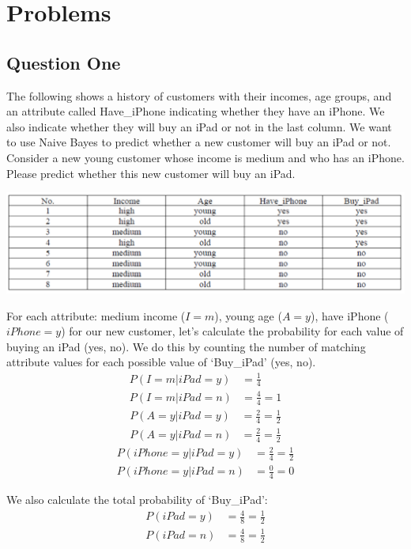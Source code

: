 \section{Problems}

\subsection{Question One}

The following shows a history of customers with their incomes, age groups, and an attribute called Have\_iPhone indicating whether they have an iPhone. We also indicate whether they will buy an iPad or not in the last column. We want to use Naive Bayes to predict whether a new customer will buy an iPad or not. Consider a new young customer whose income is medium and who has an iPhone. Please predict whether this new customer will buy an iPad.

\includegraphics[width=1\textwidth]{media/hw5_q1.png}

For each attribute: medium income ($I=m$), young age ($A=y$), have iPhone ($iPhone=y$) for our new customer, let's calculate the probability for each value of buying an iPad (yes, no). We do this by counting the number of matching attribute values for each possible value of `Buy\_iPad' (yes, no).
\begin{align}
    P(I=m | iPad = y) &= \frac{1}{4} \label{eq:q1_1} \nonumber \\
    P(I=m | iPad = n) &= \frac{4}{4} = 1
\end{align}
\begin{align}
    P(A=y | iPad = y) &= \frac{2}{4} = \frac{1}{2}\label{eq:q1_2} \nonumber \\
    P(A=y | iPad = n) &= \frac{2}{4} = \frac{1}{2}
\end{align}
\begin{align}
    P(iPhone=y | iPad = y) &= \frac{2}{4} = \frac{1}{2}\label{eq:q1_3} \nonumber \\
    P(iPhone=y | iPad = n) &= \frac{0}{4} = 0
\end{align}

We also calculate the total probability of `Buy\_iPad':
\begin{align}
    P(iPad = y) &= \frac{4}{8} = \frac{1}{2}\label{eq:q1_4} \nonumber \\
    P(iPad = n) &= \frac{4}{8} = \frac{1}{2}
\end{align}

